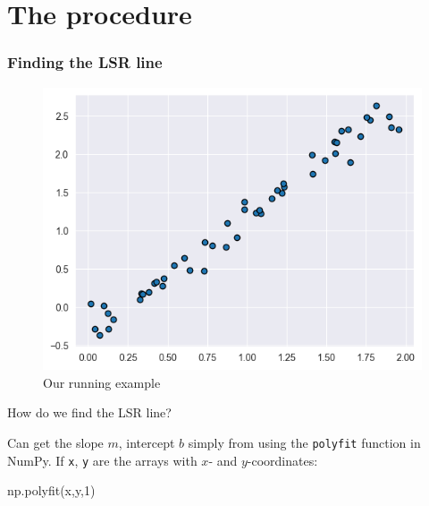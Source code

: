 \documentclass{beamer}
\newenvironment{codeblock}
    {\hfill\begin{beamerboxesrounded}[lower=codecol, width=0.8\textwidth]
    \medskip

    }
    { 
    \end{beamerboxesrounded}\hfill
    }
\theoremstyle{example}
\newcommand{\ttt}[1]{{\small\texttt{#1}}}
\begin{document}
\section{The procedure}

\begin{frame}[fragile]
\frametitle{Finding the LSR line}
\begin{figure}\label{fig:running-example}
\includegraphics[height=0.4\textheight]{example1.png}
\caption{Our running example}
\end{figure}

\vspace*{-6pt}
How do we find the LSR line?

\pause
Can get the slope $m$, intercept $b$ simply from using the \ttt{polyfit} function in NumPy. If \ttt{x}, \ttt{y} are the arrays with $x$- and $y$-coordinates:


\begin{codeblock}

\begin{python}[numbers=none]
np.polyfit(x,y,1)
\end{python}

\end{codeblock}

\end{frame}
\end{document}
